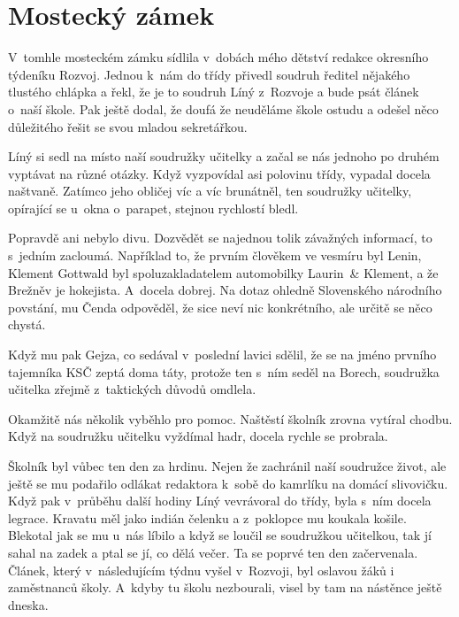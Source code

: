 
\chapter{Mostecký zámek}

V~tomhle mosteckém zámku sídlila v~dobách mého dětství redakce okresního
týdeníku Rozvoj. Jednou k~nám do třídy přivedl soudruh ředitel nějakého
tlustého chlápka a řekl, že je to soudruh Líný z~Rozvoje a bude psát článek
o~naší škole. Pak ještě dodal, že doufá že neuděláme škole ostudu a odešel něco
důležitého řešit se svou mladou sekretářkou.

Líný si sedl na místo naší soudružky učitelky a začal se
nás jednoho po druhém vyptávat na různé otázky. Když vyzpovídal asi
polovinu třídy, vypadal docela naštvaně. Zatímco jeho obličej víc a
víc brunátněl, ten soudružky učitelky, opírající se u~okna o~parapet,
stejnou rychlostí bledl.

Popravdě ani nebylo divu. Dozvědět se najednou tolik závažných informací, to
s~jedním zacloumá. Například to, že prvním člověkem ve vesmíru byl Lenin,
Klement Gottwald byl spoluzakladatelem automobilky Laurin~& Klement, a že
Brežněv je hokejista. A~docela dobrej. Na dotaz ohledně Slovenského národního
povstání, mu Čenda odpověděl, že sice neví nic konkrétního, ale určitě se něco
chystá.

Když mu pak Gejza, co sedával v~poslední lavici sdělil, že se na jméno prvního
tajemníka KSČ zeptá doma táty, protože ten s~ním seděl na Borech, soudružka
učitelka zřejmě z~taktických důvodů omdlela.

Okamžitě nás několik vyběhlo pro pomoc. Naštěstí školník zrovna vytíral chodbu.
Když na soudružku učitelku vyždímal hadr, docela rychle se probrala.

Školník byl vůbec ten den za hrdinu. Nejen že zachránil naší soudružce život,
ale ještě se mu podařilo odlákat redaktora k~sobě do kamrlíku na domácí
slivovičku. Když pak v~průběhu další hodiny Líný vevrávoral do třídy, byla
s~ním docela legrace. Kravatu měl jako indián čelenku a z~poklopce mu koukala
košile. Blekotal jak se mu u~nás líbilo a když se loučil se soudružkou
učitelkou, tak jí sahal na zadek a ptal se jí, co dělá večer. Ta se poprvé ten
den začervenala. Článek, který v~následujícím týdnu vyšel v~Rozvoji, byl
oslavou žáků i zaměstnanců školy. A~kdyby tu školu nezbourali, visel by tam na
nástěnce ještě dneska.

